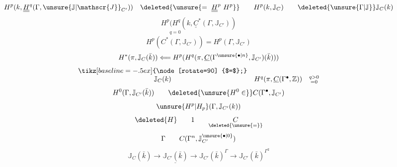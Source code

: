 \[
H^p(k,\underline{\underline{H}}^q(\Gamma,{\unsure{\mathbb{J}|\mathscr{J}}}_{C'}))
\quad\deleted{{\unsure{=\ \underline{\underline{H}}^p\ H^p}}}\qquad H^p(k,\mathbb{J}_C)\qquad\deleted{{\unsure{\Gamma|\mathbb{J}}}}\mathbb{J}_C(k)
\]
\[
H^p(H^q(k,\underline{\underline{C}}^*(\Gamma,\mathbb{J}_{C'}))
\]
\[
\overset{q=0}{H^p(C^*(\Gamma,\mathbb{J}_{C'}))}=H^p(\Gamma,\mathbb{J}_{C'})
\]
\[
H^*(\pi,\mathbb{J}_C(\bar{k}))\Longleftarrow H^p(H^q(\pi,\underline{C}(\Gamma^{{\unsure{\bullet|n}}},\mathbb{J}_{C'})(\bar{k})))
\]
\[
\begin{array}{cc}
{\tikz[baseline=-.5ex]{\node[rotate=90] {$=$};}}&\\
\mathbb{J}_C(k)&H^q(\pi,\underline{C}(\Gamma^{\bullet},\mathbb{Z}))\quad\substack{q>0\\=0}
\end{array}
\]
\[
H^0(\Gamma,\mathbb{J}_{C'}(\bar{k}))\qquad\deleted{{\unsure{H^0\in}}}C(\Gamma^{\bullet},\mathbb{J}_{C'})
\]
\[
\hfill{\unsure{H^p|H_p}}(\Gamma,\mathbb{J}_{C'}(k))
\]
\[
\deleted{H}\qquad 1\qquad\underset{\deleted{{\unsure{=}}}}{C}
\]
\[
\Gamma\qquad C(\Gamma^n,\mathbb{J}_{C'}^{{\unsure{\bullet|0}}})
\]
\[
\mathbb{J}_C(\bar{k})\longrightarrow\underline{\mathbb{J}_{C'}(\bar{k})}\longrightarrow\mathbb{J}_{C'}(\bar{k})^\Gamma\longrightarrow\mathbb{J}_{C'}(\bar{k})^{\Gamma^2}
\]
